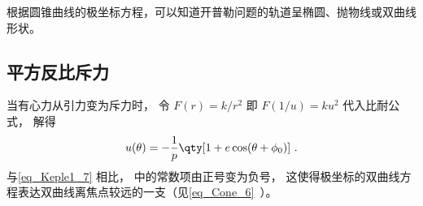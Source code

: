 根据圆锥曲线的极坐标方程，可以知道开普勒问题的轨道呈椭圆、抛物线或双曲线形状。

\subsection{平方反比斥力}
当有心力从引力变为斥力时， 令 $F(r) = k/r^2$ 即 $F(1/u) = ku^2$ 代入比耐公式， 解得
\begin{equation}%
u(\theta) = -\frac{1}{p} \qty[1 + e\cos(\theta  + \phi_0)]~.
\end{equation}
与\autoref{eq_Keple1_7} 相比， 中的常数项由正号变为负号， 这使得极坐标的双曲线方程表达双曲线离焦点较远的一支（见\autoref{eq_Cone_6}~）。
